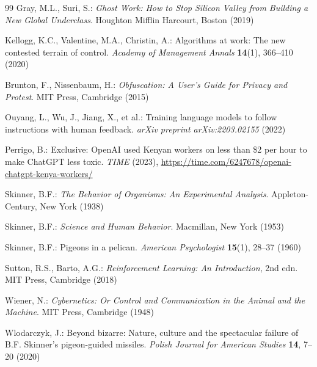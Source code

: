 \documentclass[11pt, a4paper]{article}
\begin{document}
\begin{thebibliography}{99}
Gray, M.L., Suri, S.: \textit{Ghost Work: How to Stop Silicon Valley from Building a New Global Underclass}. Houghton Mifflin Harcourt, Boston (2019)

Kellogg, K.C., Valentine, M.A., Christin, A.: Algorithms at work: The new contested terrain of control. \textit{Academy of Management Annals} \textbf{14}(1), 366--410 (2020)

Brunton, F., Nissenbaum, H.: \textit{Obfuscation: A User's Guide for Privacy and Protest}. MIT Press, Cambridge (2015)

Ouyang, L., Wu, J., Jiang, X., et al.: Training language models to follow instructions with human feedback. \textit{arXiv preprint arXiv:2203.02155} (2022)

Perrigo, B.: Exclusive: OpenAI used Kenyan workers on less than \$2 per hour to make ChatGPT less toxic. \textit{TIME} (2023), \url{https://time.com/6247678/openai-chatgpt-kenya-workers/}

Skinner, B.F.: \textit{The Behavior of Organisms: An Experimental Analysis}. Appleton-Century, New York (1938)

Skinner, B.F.: \textit{Science and Human Behavior}. Macmillan, New York (1953)

Skinner, B.F.: Pigeons in a pelican. \textit{American Psychologist} \textbf{15}(1), 28--37 (1960)

Sutton, R.S., Barto, A.G.: \textit{Reinforcement Learning: An Introduction}, 2nd edn. MIT Press, Cambridge (2018)

Wiener, N.: \textit{Cybernetics: Or Control and Communication in the Animal and the Machine}. MIT Press, Cambridge (1948)

Wlodarczyk, J.: Beyond bizarre: Nature, culture and the spectacular failure of B.F. Skinner's pigeon-guided missiles. \textit{Polish Journal for American Studies} \textbf{14}, 7--20 (2020)

\end{thebibliography}
\end{document}
